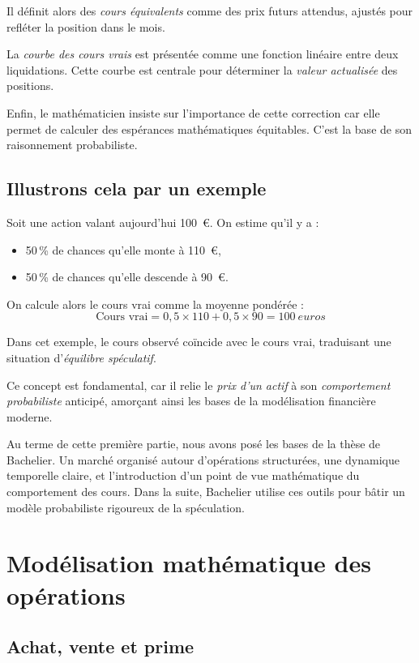 \documentclass[12pt,a4paper]{article}
\begin{document}
Il définit alors des \textit{cours équivalents} comme des prix futurs attendus, ajustés pour refléter la position dans le mois.

La \textit{courbe des cours vrais} est présentée comme une fonction linéaire entre deux liquidations. Cette courbe est centrale pour déterminer la \textit{valeur actualisée} des positions.

Enfin, le mathématicien insiste sur l'importance de cette correction car elle permet de calculer des espérances mathématiques équitables. C'est la base de son raisonnement probabiliste.

\subsection{Illustrons cela par un exemple}

Soit une action valant aujourd’hui 100~€. On estime qu’il y a :
\begin{itemize}
  \item 50\,\% de chances qu’elle monte à 110~€,
  \item 50\,\% de chances qu’elle descende à 90~€.
\end{itemize}

On calcule alors le cours vrai comme la moyenne pondérée :
\[
\text{Cours vrai} = 0{,}5 \times 110 + 0{,}5 \times 90 = 100~euros
\]

Dans cet exemple, le cours observé coïncide avec le cours vrai, traduisant une situation d’\textit{équilibre spéculatif}.

Ce concept est fondamental, car il relie le \textit{prix d’un actif} à son \textit{comportement probabiliste} anticipé, amorçant ainsi les bases de la modélisation financière moderne.

\bigskip

\noindent
Au terme de cette première partie, nous avons  posé les bases de la thèse de Bachelier. Un marché organisé autour d’opérations structurées, une dynamique temporelle claire, et l’introduction d'un point de vue mathématique du comportement des cours. Dans la suite, Bachelier utilise ces outils pour bâtir un modèle probabiliste rigoureux de la spéculation.

\section{Modélisation mathématique des opérations}

\subsection{Achat, vente et prime}
\end{document}
